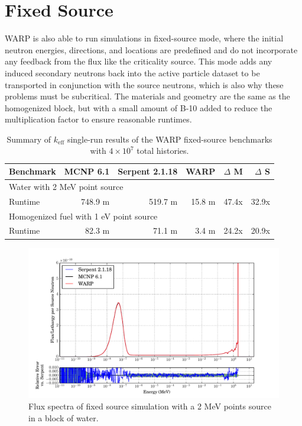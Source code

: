 \section{Fixed Source}

WARP is also able to run simulations in fixed-source mode, where the initial neutron energies, directions, and locations are predefined and do not incorporate any feedback from the flux like the criticality source.  This mode adds any induced secondary neutrons back into the active particle dataset to be transported in conjunction with the source neutrons, which is also why these problems must be subcritical.  The materials and geometry are the same as the homogenized block, but with a small amount of B-10 added to reduce the multiplication factor to ensure reasonable runtimes.

\begin{table}[h]
\centering
\caption{Summary of $k_\mathrm{eff}$ single-run results of the WARP fixed-source benchmarks with $4\times10^7$ total histories.}
\label{fixed_summary}
\begin{tabular}{| l | r | r | r | r | r |}
 \hline
 Benchmark & MCNP 6.1 & Serpent 2.1.18 & WARP & $\Delta$ M & $\Delta$ S  \\
\hline
\hline
\multicolumn{6}{|l|}{Water with 2 MeV point source }  \\
\hline
 Runtime               &  748.9 m & 519.7 m & 15.8 m & 47.4x  & 32.9x  \\
 \hline
 \hline
\multicolumn{6}{|l|}{Homogenized fuel with 1 eV point source }\\
\hline
 Runtime               &  82.3 m &  71.1 m &  3.4 m & 24.2x  & 20.9x  \\
 \hline
\end{tabular}
\end{table}

\begin{figure}[h!]
\centering
\includegraphics[width=\textwidth,trim= 1cm 0cm 1cm 0cm]{graphics/finalresults/fixed_spec_water.pdf}
\caption{Flux spectra of fixed source simulation with a 2 MeV points source in a block of water. \label{fixed_spec_water} }
\end{figure}

